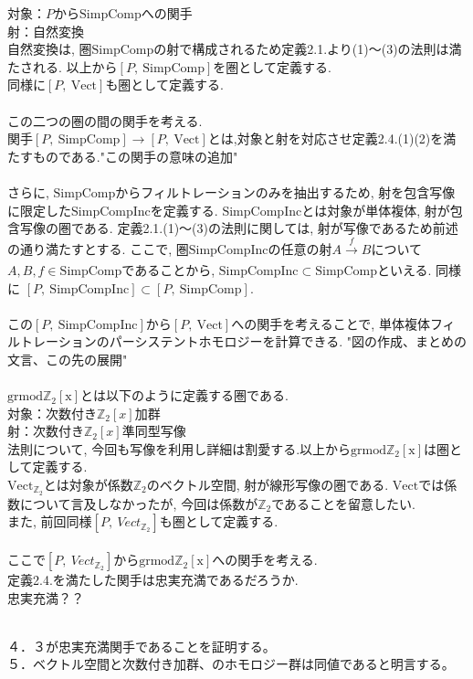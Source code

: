\documentclass[a4paper]{jsarticle}
\theoremstyle{definition}
\newcommand{\SimpComp}{{\mathrm{SimpComp}}}
\newcommand{\Fun}[2]{[#1,~#2]}
\newcommand{\Vect}{{\mathrm{Vect}}}
\newcommand{\SimpCompInc}{{\mathrm{SimpCompInc}}}
\newcommand{\grmodZ}{{\mathrm{grmod \mathbb{Z}_2[x]}}}
\begin{document}
対象：$P$から$\SimpComp$への関手\\
射：自然変換\\
自然変換は, 圏$\SimpComp$の射で構成されるため定義2.1.より(1)～(3)の法則は満たされる. 以上から$\Fun{P}{\SimpComp}$を圏として定義する. \\
同様に$\Fun{P}{\Vect}$も圏として定義する. \\
\noindent\\
この二つの圏の間の関手を考える. \\
関手$\Fun{P}{\SimpComp}\rightarrow \Fun{P}{\Vect}$とは,対象と射を対応させ定義2.4.(1)(2)を満たすものである."この関手の意味の追加"\\
\noindent\\
さらに, $\SimpComp$からフィルトレーションのみを抽出するため, 射を包含写像に限定した$\SimpCompInc$を定義する. $\SimpCompInc$とは対象が単体複体, 射が包含写像の圏である. 定義2.1.(1)～(3)の法則に関しては, 射が写像であるため前述の通り満たすとする. ここで, 圏$\SimpCompInc$の任意の射$A\xrightarrow[]{f} B$について$A, B, f\in \SimpComp$であることから, $\SimpCompInc\subset \SimpComp$といえる. 同様に $\Fun{P}{\SimpCompInc}\subset \Fun{P}{\SimpComp}$.\\
\noindent\\
この$\Fun{P}{\SimpCompInc}$から$\Fun{P}{\Vect}$への関手を考えることで, 単体複体フィルトレーションのパーシステントホモロジーを計算できる. "図の作成、まとめの文言、この先の展開"\\
\noindent\\
$\grmodZ$とは以下のように定義する圏である.\\
対象：次数付き$\mathbb{Z}_2[x]$加群\\
射：次数付き$\mathbb{Z}_2[x]$準同型写像\\
法則について, 今回も写像を利用し詳細は割愛する.以上から$\grmodZ$は圏として定義する. 
\noindent\\
$\Vect_{\mathbb{Z}_2}$とは対象が係数$\mathbb{Z}_2$のベクトル空間, 射が線形写像の圏である. $\Vect$では係数について言及しなかったが, 今回は係数が$\mathbb{Z}_2$であることを留意したい.\\
また, 前回同様$\Fun{P}{Vect_{\mathbb{Z}_2}}$も圏として定義する.\\
\noindent\\
ここで$\Fun{P}{Vect_{\mathbb{Z}_2}}$から$\grmodZ$への関手を考える.\\
定義2.4.を満たした関手は忠実充満であるだろうか.\\
忠実充満？？






\noindent\\
４．３が忠実充満関手であることを証明する。\\
５．ベクトル空間と次数付き加群、のホモロジー群は同値であると明言する。\\
\end{document}
